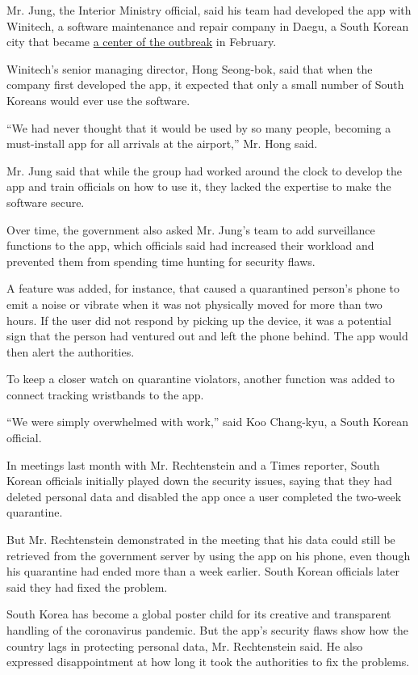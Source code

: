 Mr. Jung, the Interior Ministry official, said his team had developed
the app with Winitech, a software maintenance and repair company in
Daegu, a South Korean city that became
\href{https://www.nytimes.com/2020/02/25/world/asia/daegu-south-korea-coronavirus.html}{a
center of the outbreak} in February.

Winitech's senior managing director, Hong Seong-bok, said that when the
company first developed the app, it expected that only a small number of
South Koreans would ever use the software.

``We had never thought that it would be used by so many people, becoming
a must-install app for all arrivals at the airport,'' Mr. Hong said.

Mr. Jung said that while the group had worked around the clock to
develop the app and train officials on how to use it, they lacked the
expertise to make the software secure.

Over time, the government also asked Mr. Jung's team to add surveillance
functions to the app, which officials said had increased their workload
and prevented them from spending time hunting for security flaws.

A feature was added, for instance, that caused a quarantined person's
phone to emit a noise or vibrate when it was not physically moved for
more than two hours. If the user did not respond by picking up the
device, it was a potential sign that the person had ventured out and
left the phone behind. The app would then alert the authorities.

To keep a closer watch on quarantine violators, another function was
added to connect tracking wristbands to the app.

``We were simply overwhelmed with work,'' said Koo Chang-kyu, a South
Korean official.

In meetings last month with Mr. Rechtenstein and a Times reporter, South
Korean officials initially played down the security issues, saying that
they had deleted personal data and disabled the app once a user
completed the two-week quarantine.

But Mr. Rechtenstein demonstrated in the meeting that his data could
still be retrieved from the government server by using the app on his
phone, even though his quarantine had ended more than a week earlier.
South Korean officials later said they had fixed the problem.

South Korea has become a global poster child for its creative and
transparent handling of the coronavirus pandemic. But the app's security
flaws show how the country lags in protecting personal data, Mr.
Rechtenstein said. He also expressed disappointment at how long it took
the authorities to fix the problems.

